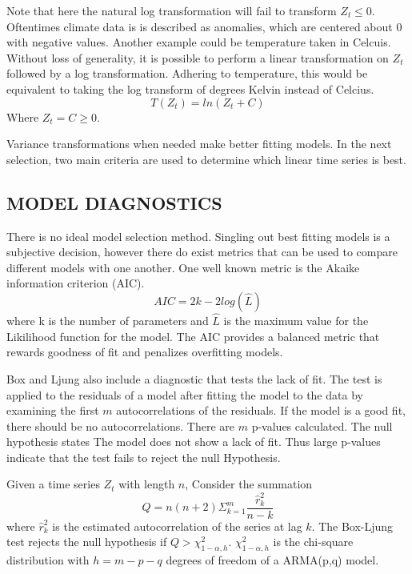 Note that here the natural log transformation will fail to transform $Z_t \leq 0$. Oftentimes climate data is is described as anomalies, which are centered about 0 with negative values. Another example could be temperature taken in Celcuis. Without loss of generality, it is possible to perform a linear transformation on $Z_t$ followed by a log transformation. Adhering to temperature, this would be equivalent to taking the log transform of degrees Kelvin instead of Celcius. 
\begin{equation}
T(Z_t) = ln(Z_t + C)
\end{equation}
Where $Z_t = C \geq 0$.

Variance transformations when needed make better fitting models. In the next selection, two main criteria are used to determine which linear time series is best.

\subsection{MODEL DIAGNOSTICS}

There is no ideal model selection method. Singling out best fitting models is a subjective decision, however there do exist metrics that can be used to compare different models with one another. One well known metric is the Akaike information criterion (AIC)\cite{akaike1974new}.
\begin{equation}
AIC = 2k - 2log(\hat{L})
\end{equation}
where k is the number of parameters and $\hat{L}$ is the maximum value for the Likilihood function for the model. The AIC provides a balanced metric that rewards goodness of fit and penalizes overfitting models.

Box and Ljung \cite{ljung1978measure} also include a diagnostic that tests the lack of fit. The test is applied to the residuals of a model after fitting the model to the data by examining the first $m$ autocorrelations of the residuals. If the model is a good fit, there should be no autocorrelations. There are $m$ p-values calculated. The null hypothesis states The model does not show a lack of fit. Thus large p-values indicate that the test fails to reject the null Hypothesis.

Given a time series $Z_t$ with length $n$, Consider the summation
\begin{equation}\label{eq:BL}
Q = n(n+2)\Sigma^m_{k=1} \frac{\hat{r}_k^2}{n-k}
\end{equation}
where $\hat{r}_k^2$ is the estimated autocorrelation of the series at lag $k$. The Box-Ljung test rejects the null hypothesis if $Q > \chi^2_{1-\alpha,h}$. $\chi^2_{1-\alpha,h}$ is the chi-square distribution with $h=m-p-q$ degrees of freedom of a ARMA(p,q) model.

